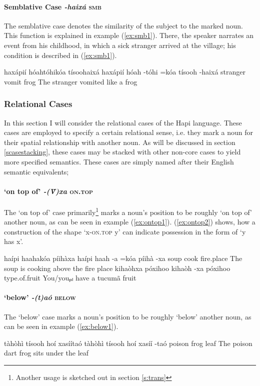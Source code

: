 \documentclass[a4paper, 12pt, oneside]{memoir}
\newcommand{\emh}[1]{\textit{#1}}
\begin{document}
\paragraph{Semblative Case \emh{-haixá} \textsc{smb}}
The semblative case denotes the similarity of the subject to the marked noun. This function is explained in example (\ref{ex:smb1}). There, the speaker narrates an event from his childhood, in which a sick stranger arrived at the village; his condition is described in (\ref{ex:smb1}).
\begin{examples}
\ex \label{ex:smb1}
\words haxápií hóahtóhikóa tísoohaixá
\bits haxápií hóah -tóhi =kóa tísooh -haixá
\gloss stranger vomit {\Dpasto} {\Decl} frog {\Smb} 
\tr The stranger vomited like a frog
\end{examples}
\subsubsection{Relational Cases}\label{srelcase}
In this section I will consider the relational cases of the Hapi language. These cases are employed to specify a certain relational sense, i.e. they mark a noun for their spatial relationship with another noun. As will be discussed in section \ref{scasestacking}, these cases may be stacked with other non-core cases to yield more specified semantics. These cases are simply named after their English semantic equivalents;
\paragraph{`on top of' \emh{-(V̀)xa} \textsc{on.top} }
The `on top of' case primarily\footnote{Another usage is sketched out in section \ref{s:trans}} marks a noun's position to be roughly `on top of' another noun, as can be seen in example (\ref{ex:ontop1}). (\ref{ex:ontop2}) shows, how a construction of the shape `x-\textsc{on.top} y' can indicate possession in the form of `y has x'.
\begin{examples}
\ex \label{ex:ontop1}
\words haípi haahakóa píihàxa
\bits haípi haah -a =kóa píihà -xa
\gloss soup cook {\St} {\Decl} fire.place {\Ont}
\tr The soup is cooking above the fire place
\ex \label{ex:ontop2}
\words kihaòhxa póxihoo
\bits kihaòh -xa póxihoo
\gloss type.of.fruit {\Ont} {\Ss}
\tr You/youₚₗ have a tucumã fruit
\end{examples}
\paragraph{`below' \emh{-(t)aó} \textsc{below}}
The `below' case marks a noun's position to be roughly `below' another noun, as can be seen in example (\ref{ex:below1}).
\begin{examples}
\ex \label{ex:below1}
\words tàhòhì tísooh hoí xasíítaó
\bits tàhòhì tísooh hoí xasíí -taó
\gloss poison frog {\Cop} leaf {\Bel}
\tr The poison dart frog sits under the leaf
\end{examples}
\end{document}

